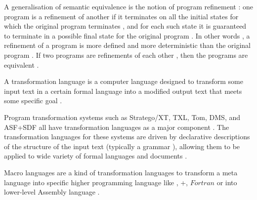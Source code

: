A generalisation of semantic equivalence  is the notion of program refinement : one program is a refinement
of another  if it terminates
on all the initial states 
for which the original program terminates , and for each such state  it is guaranteed to terminate  in a
possible final state for the original program . In other words , a
refinement of a program  is more defined  and more deterministic  than the
original program . If two programs are
refinements of each other , then the programs are equivalent .

\bigskip
A transformation language  is a computer language
 designed to transform some input text
 in a certain
formal language  into a modified output text
 that meets some specific goal
.

Program transformation systems such as  Stratego/XT, TXL, Tom, DMS, and ASF+SDF all have transformation languages
 as a major component . The transformation languages for these systems  are driven by declarative descriptions  of the structure of the input text  (typically a grammar ), allowing them
to be applied  to wide variety of formal
languages and documents .

Macro languages  are a kind of transformation languages  to transform a meta language  into specific higher programming language like  \java, \cpp+, $Fortran$ or into lower-level Assembly
language .


